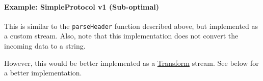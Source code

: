 \begin{Shaded}
\begin{Highlighting}[]
 \NormalTok{;}
 \NormalTok{);}

 
  \NormalTok{(}
   \NormalTok{= }\NormalTok{;}
   \NormalTok{= }\NormalTok{;}
\NormalTok{\}}

 \NormalTok{= }\NormalTok{() \{}
   \NormalTok{++;}
   \NormalTok{)}
   \NormalTok{\{}
      
      \NormalTok{);}
  \NormalTok{\}}
\NormalTok{\};}
\end{Highlighting}
\end{Shaded}

\paragraph{Example: SimpleProtocol v1 (Sub-optimal)}

This is similar to the \texttt{parseHeader} function described above,
but implemented as a custom stream. Also, note that this implementation
does not convert the incoming data to a string.

However, this would be better implemented as a
\hyperref[stream\_class\_stream\_transform]{Transform} stream. See below
for a better implementation.

